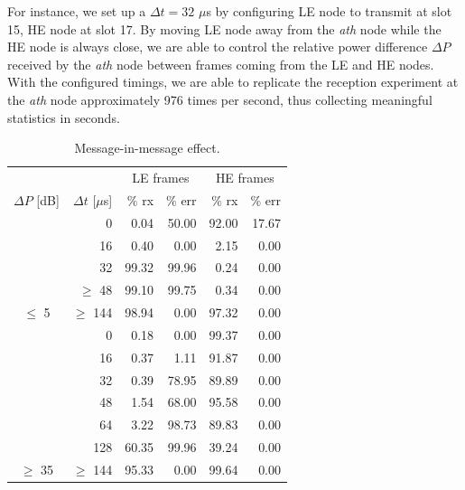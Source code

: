 \documentclass[twoside,nohyper]{tufte-book}
\theoremstyle{definition}
\theoremstyle{definition}
\theoremstyle{definition}
\theoremstyle{remark}
\begin{document}
For instance, we set up a \(\Delta t = 32\) \(\mu\)s by configuring LE
node to transmit at slot 15, HE node at slot 17. By moving LE node away
from the \emph{ath} node while the HE node is always close, we are able
to control the relative power difference \(\Delta P\) received by the
\emph{ath} node between frames coming from the LE and HE nodes. With the
configured timings, we are able to replicate the reception experiment at
the \emph{ath} node approximately 976 times per second, thus collecting
meaningful statistics in seconds.

\begin{table}

\begin{center}
\begin{tabular}{crrrrr}
\toprule
\multicolumn{2}{c}{ } & \multicolumn{2}{c}{LE frames} & \multicolumn{2}{c}{HE frames} \\
\cmidrule(l{2pt}r{2pt}){3-4} \cmidrule(l{2pt}r{2pt}){5-6}
$\Delta P$ [dB] & $\Delta t$ [$\mu$s] & $\%$ rx & $\%$ err & $\%$ rx & $\%$ err\\
\midrule
 & 0 & 0.04 & 50.00 & 92.00 & 17.67\\

 & 16 & 0.40 & 0.00 & 2.15 & 0.00\\

 & 32 & 99.32 & 99.96 & 0.24 & 0.00\\

 & $\geq$ 48 & 99.10 & 99.75 & 0.34 & 0.00\\

\multirow{-5}{*}{\centering\arraybackslash $\leq$ 5} & $\geq$ 144 & 98.94 & 0.00 & 97.32 & 0.00\\
\cmidrule{1-6}
 & 0 & 0.18 & 0.00 & 99.37 & 0.00\\

 & 16 & 0.37 & 1.11 & 91.87 & 0.00\\

 & 32 & 0.39 & 78.95 & 89.89 & 0.00\\

 & 48 & 1.54 & 68.00 & 95.58 & 0.00\\

 & 64 & 3.22 & 98.73 & 89.83 & 0.00\\

 & 128 & 60.35 & 99.96 & 39.24 & 0.00\\

\multirow{-7}{*}{\centering\arraybackslash $\geq$ 35} & $\geq$ 144 & 95.33 & 0.00 & 99.64 & 0.00\\
\bottomrule
\end{tabular}
\end{center}
\caption{\label{tab:secondcapturet}Message-in-message effect.}
\end{table}
\end{document}
